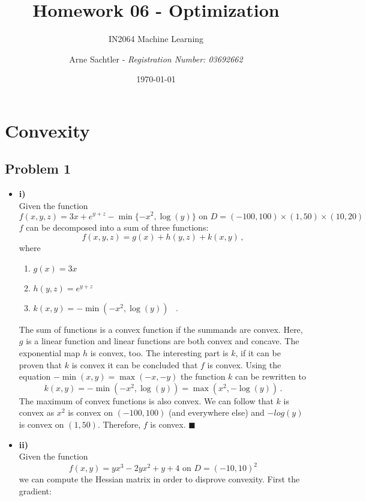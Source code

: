 \documentclass{scrartcl}
\title{Homework 06 - Optimization}
\author{Arne Sachtler - \textit{Registration Number: 03692662}}
\date{\today}
\subtitle{IN2064 Machine Learning}
\newcommand{\qed}{\hfill $\blacksquare$}
\begin{document}
\maketitle
	
\section{Convexity}
\subsection{Problem 1}
\begin{itemize}
	\item \textbf{i)}\\
	Given the function
	\begin{equation}
		f(x,y,z) = 3x + e^{y+z} - \min\{-x^2, \log(y)\} \text{ on } D = (-100,100)\times(1,50)\times(10,20)
	\end{equation}
	$f$ can be decomposed into a sum of three functions:
	\begin{equation}
		f(x,y,z) = g(x) + h(y,z) + k(x,y)\, ,
	\end{equation}
	where 
	\begin{enumerate}
		\item $g(x) = 3x$
		\item $h(y,z) = e^{y+z}$
		\item $k(x,y) = -\min(-x^2, \log(y))$ \, .
	\end{enumerate}
	The sum of functions is a convex function if the summands are convex. Here, $g$ is a linear function and linear functions are both convex and concave. The exponential map $h$ is convex, too. The interesting part is $k$, if it can be proven that $k$ is convex it can be concluded that $f$ is convex. Using the equation $-\min(x,y) = \max(-x,-y)$ the function $k$ can be rewritten to
	\begin{equation}
		k(x,y) = -\min(-x^2, \log(y)) = \max(x^2, -\log(y)) \, .
	\end{equation}
	The maximum of convex functions is also convex. We can follow that $k$ is convex as $x^2$ is convex on $(-100,100)$ (and everywhere else) and $-log(y)$ is convex on $(1,50)$. Therefore, $f$ is convex. \qed
	\item \textbf{ii)}\\
	Given the function
	\begin{equation}
		f(x,y) = yx^3 - 2yx^2 + y + 4 \text{ on } D = (-10, 10)^2
	\end{equation}
	we can compute the Hessian matrix in order to disprove convexity. First the gradient:

\end{itemize}
\end{document}
